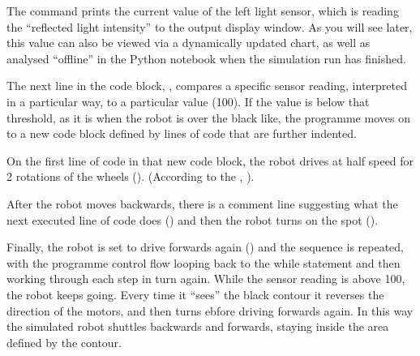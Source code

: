 \documentclass[letterpaper,10pt,english]{sphinxmanual}
\begin{document}
The  command prints the current value of the left light sensor, which is reading the “reflected light intensity” to the output display window. As you will see later, this value can also be viewed via a dynamically updated chart, as well as analysed “offline” in the Python notebook when the simulation run has finished.

The next line in the code block, , compares a specific sensor reading, interpreted in a particular way, to a particular value (100). If the value is below that threshold, as it is when the robot is over the black like, the programme moves on to a new code block defined by lines of code that are further indented.

On the first line of code in that new code block, the robot drives  at half speed for 2 rotations of the wheels (). (According to the , ).

After the robot moves backwards, there is a comment line suggesting what the next executed line of code does () and then the robot turns on the spot ().

Finally, the robot is set to drive forwards again () and the sequence is repeated, with the programme control flow looping back to the while statement and then working through each step in turn again. While the sensor reading is above 100, the robot keeps going. Every time it “sees” the black contour it reverses the direction of the motors, and then turns ebfore driving forwards again. In this way the simulated robot shuttles backwards and
forwards, staying inside the area defined by the contour.
\end{document}
